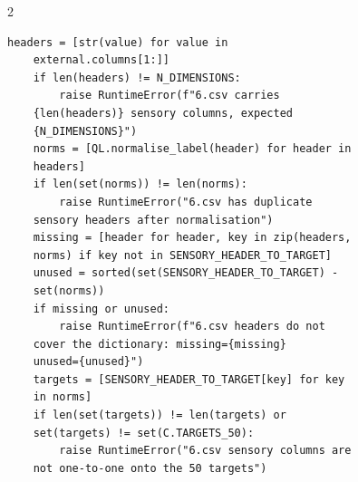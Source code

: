 \begin{multicols}{2}
\begin{Verbatim}[fontsize=\scriptsize]
    headers = [str(value) for value in
    external.columns[1:]]
    if len(headers) != N_DIMENSIONS:
        raise RuntimeError(f"6.csv carries
    {len(headers)} sensory columns, expected
    {N_DIMENSIONS}")
    norms = [QL.normalise_label(header) for header in
    headers]
    if len(set(norms)) != len(norms):
        raise RuntimeError("6.csv has duplicate
    sensory headers after normalisation")
    missing = [header for header, key in zip(headers,
    norms) if key not in SENSORY_HEADER_TO_TARGET]
    unused = sorted(set(SENSORY_HEADER_TO_TARGET) -
    set(norms))
    if missing or unused:
        raise RuntimeError(f"6.csv headers do not
    cover the dictionary: missing={missing}
    unused={unused}")
    targets = [SENSORY_HEADER_TO_TARGET[key] for key
    in norms]
    if len(set(targets)) != len(targets) or
    set(targets) != set(C.TARGETS_50):
        raise RuntimeError("6.csv sensory columns are
    not one-to-one onto the 50 targets")


\end{Verbatim}
\end{multicols}
